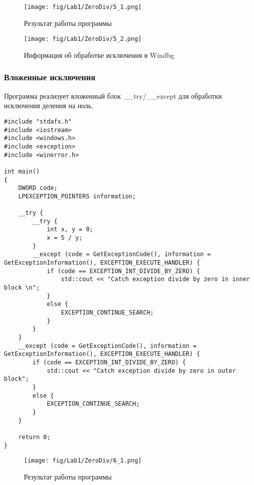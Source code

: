 \begin{figure}[H]
    \begin{center}
        \texttt{[image: fig/Lab1/ZeroDiv/5\_1.png]}
        \caption{Результат работы программы}
        \label{pic:5_1}
    \end{center}
\end{figure}

\begin{figure}[H]
    \begin{center}
        \texttt{[image: fig/Lab1/ZeroDiv/5\_2.png]}
        \caption{Информация об обработке исключения в Windbg}
        \label{pic:5_2}
    \end{center}
\end{figure}

\subsubsection{Вложенные исключения}
Программа реализует вложенный блок \_\_try/\_\_except для обработки исключения деления на ноль.

\begin{lstlisting}[caption=Вложенные исключения]
#include "stdafx.h"
#include <iostream>
#include <windows.h>
#include <exception>
#include <winerror.h>

int main()
{
    DWORD code;
    LPEXCEPTION_POINTERS information;

    __try {
        __try {
            int x, y = 0;
            x = 5 / y;
        }
        __except (code = GetExceptionCode(), information = GetExceptionInformation(), EXCEPTION_EXECUTE_HANDLER) {
            if (code == EXCEPTION_INT_DIVIDE_BY_ZERO) {
                std::cout << "Catch exception divide by zero in inner block \n";
            }
            else {
                EXCEPTION_CONTINUE_SEARCH;
            }
        }
    }
    __except (code = GetExceptionCode(), information = GetExceptionInformation(), EXCEPTION_EXECUTE_HANDLER) {
        if (code == EXCEPTION_INT_DIVIDE_BY_ZERO) {
            std::cout << "Catch exception divide by zero in outer block";
        }
        else {
            EXCEPTION_CONTINUE_SEARCH;
        }
    }

    return 0;
}
\end{lstlisting}

\begin{figure}[H]
    \begin{center}
        \texttt{[image: fig/Lab1/ZeroDiv/6\_1.png]}
        \caption{Результат работы программы}
        \label{pic:6_1}
    \end{center}
\end{figure}

